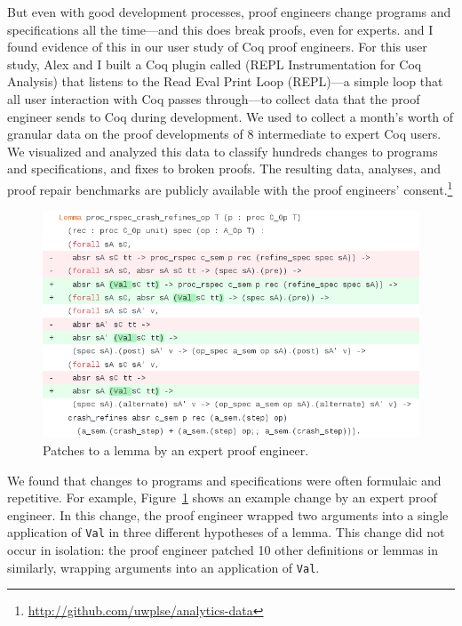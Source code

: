 But even with good development processes, proof engineers change programs and specifications all the time---and this does break proofs, 
even for experts.
 and I found evidence of this in our user study of Coq proof engineers.
For this user study, Alex and I built a Coq plugin called 
(REPL Instrumentation for Coq Analysis) that listens to the Read Eval Print
Loop (REPL)---a simple loop that all user interaction with Coq passes through---to collect data that the proof engineer sends to Coq during development.
We used \toolname to collect a month's worth of granular data on 
the proof developments of 8 intermediate to expert Coq users.
We visualized and analyzed this data to classify hundreds changes to programs and specifications,
and fixes to broken proofs.
The resulting data, analyses, and proof repair benchmarks are publicly available with the proof engineers' 
consent.\footnote{\url{http://github.com/uwplse/analytics-data}}

\begin{figure}
  \includegraphics[width=1.0\textwidth]{maintenance/fig/patch.png}
  \caption{Patches to a lemma by an expert proof engineer.}
  \label{fig:patch}
\end{figure}

We found that changes to programs and specifications were often formulaic and repetitive.
For example, Figure~\ref{fig:patch} shows an example change by an expert proof engineer.
In this change, the proof engineer wrapped two arguments into a single application of \lstinline{Val}
in three different hypotheses of a lemma.
This change did not occur in isolation: the proof engineer patched 10 other definitions or lemmas
in similarly, wrapping arguments into an application of
\lstinline{Val}.

